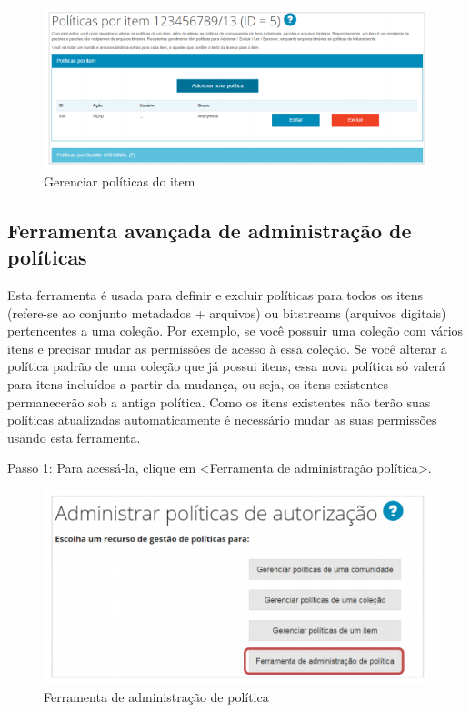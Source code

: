 \documentclass[12pt,hidelinks]{article}
\begin{document}
     \begin{figure}[!htp]
                \centering
                \includegraphics[scale=0.8]{figura/Figura82.png}
                \caption{Gerenciar políticas do item}
            \label{Rotulo}
        \end{figure}

\newpage

    \subsection{Ferramenta avançada de administração de políticas}
    
    Esta ferramenta é usada para definir e excluir políticas para todos os itens (refere-se ao conjunto metadados + arquivos) ou bitstreams (arquivos digitais) pertencentes a uma coleção. Por exemplo, se você possuir uma coleção com vários itens e precisar mudar as permissões de acesso à essa coleção. Se você alterar a política padrão de uma coleção que já possui itens, essa nova política só valerá para itens incluídos a partir da mudança, ou seja, os itens existentes permanecerão sob a antiga política. Como os itens existentes não terão suas políticas atualizadas automaticamente é necessário mudar as suas permissões usando esta ferramenta.
    
    \singlespacing
    
    Passo 1: Para acessá-la, clique em <Ferramenta de administração política>.
    
    \begin{figure}[!htp]
                \centering
                \includegraphics[scale=0.8]{figura/Figura83.png}
                \caption{Ferramenta de administração de política}
            \label{Rotulo}
        \end{figure}
    
\end{document}
